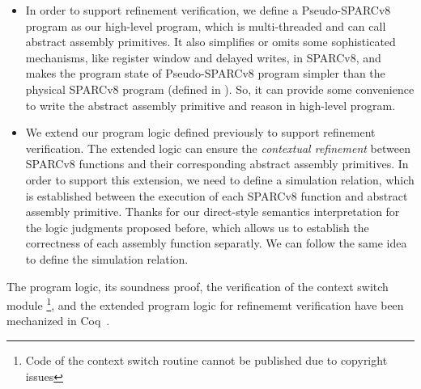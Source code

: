 \begin{itemize}
    \item 
    In order to support refinement verification, we define a 
    Pseudo-SPARCv8 program as our high-level program, which 
    is multi-threaded and can call abstract 
    assembly primitives. It also simplifies or omits some 
    sophisticated mechanisms, like register window 
    and delayed writes, in SPARCv8,  
    and makes the program state of Pseudo-SPARCv8 program 
    simpler than the physical SPARCv8 program 
    (defined in \Sec{\ref{sec:modeling}}). 
    So, it can provide some convenience 
    to write the abstract assembly primitive 
    and reason in high-level program. 
    
    \item
    We extend our program logic defined 
    previously to support refinement verification. 
    The extended logic can ensure 
    the {\it contextual refinement} between
    SPARCv8 functions and their corresponding 
    abstract assembly primitives. In order to support 
    this extension, we need to define a simulation 
    relation, which is established 
    between the execution of each SPARCv8 function 
    and abstract assembly primitive. 
    Thanks for our direct-style semantics interpretation 
    for the logic judgments proposed before, 
    which allows us to establish the correctness of 
    each assembly function separatly. 
    We can follow the same idea to define the  
    simulation relation.  

\end{itemize}
The program logic, its soundness proof, 
the verification of the context switch module
\footnote{Code of the context switch routine cannot 
be published due to copyright issues}, 
and the extended program logic for 
refinememt verification have been mechanized in 
Coq~\cite{coqimp}.


